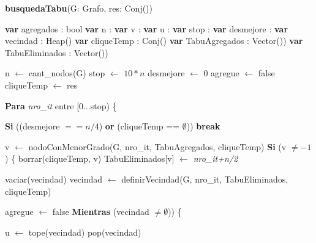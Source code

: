 \footnotesize 
\textbf{busquedaTabu}(G: Grafo, res: Conj(\entero)) \\
\begin{algorithm}[H]
\linesnumbered
\incmargin{3em}

	\BlankLine
	\textbf{var} agregados 		: bool		 													
	\textbf{var} n 				: \entero														{}
	\textbf{var} v 				: \entero														{}
	\textbf{var} u 				: \entero														{}
	\textbf{var} stop				: \entero							 							{}
	\textbf{var} desmejore		: \entero														{}
	\textbf{var} vecindad 		: Heap(\entero)									 			
	\textbf{var} cliqueTemp 		: Conj(\entero) 												
	\textbf{var} TabuAgregados 	: Vector(\entero))											 	
	\textbf{var} TabuEliminados 	: Vector(\entero)) 												
	
	\BlankLine \BlankLine
	n 				$\leftarrow$ cant\_nodos(G)													
	stop 			$\leftarrow$ $10*n$															
	desmejore 		$\leftarrow$ 0																
	agregue 		$\leftarrow$ false																
	cliqueTemp 	$\leftarrow$ res																
	

	\BlankLine \BlankLine		
	\textbf{Para} \textit{nro\_it} entre [0...stop) \{ 												

	\BlankLine	
	\tab \textbf{Si} ((desmejore $== n/4$) \textbf{or} (cliqueTemp == $\emptyset$))		
	\tab \tab \textbf{break}																		

	\BlankLine \BlankLine				
	\tab v $\leftarrow$ nodoConMenorGrado(G, nro\_it, TabuAgregados, cliqueTemp)				
	\tab \textbf{Si} (v $\neq -1$) \{																
	\tab \tab borrar(cliqueTemp, v) 																	
	\tab \tab TabuEliminados[v] $\leftarrow$ \textit{nro\_it+n/2}			 					

	\BlankLine \BlankLine		
	\tab \tab vaciar(vecindad)																	
	\tab \tab vecindad $\leftarrow$ definirVecindad(G, nro\_it, TabuEliminados, cliqueTemp)	 	

	\BlankLine \BlankLine		
	\tab \tab agregue $\leftarrow$ false														
	\tab \tab \textbf{Mientras} (vecindad $\neq \emptyset$)) \{								

	\BlankLine
	\tab \tab \tab u $\leftarrow$ tope(vecindad)												
	\tab \tab \tab pop(vecindad)																	


\end{algorithm}
